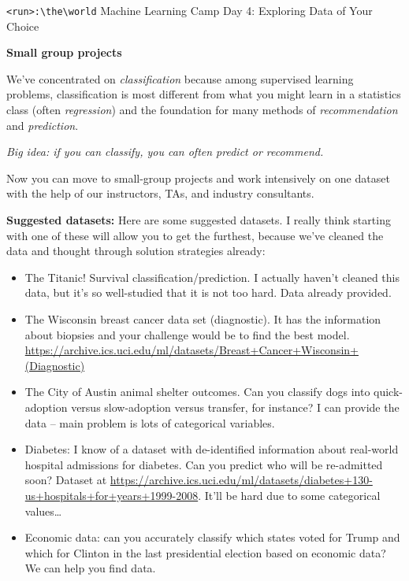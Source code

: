\documentclass[10pt]{article}
\newcommand{\code}[1]{\colorbox{light-gray}{\texttt{#1}}}
\newcommand{\headerclass}{\code{<run>:\textbackslash the\textbackslash world} Machine Learning Camp}
\newcommand{\headersection}{Day 4: Exploring Data of Your Choice}
\newcommand{\headertitle}{Small group projects}
\begin{document}
\headerclass\xspace {} \headersection\\
\begin{center}{ \large \textbf{\headertitle} }\end{center}

We've concentrated on \textit{classification} because among supervised learning problems, classification is most different from what you might learn in a statistics class (often \textit{regression}) and the foundation for many methods of \textit{recommendation} and \textit{prediction}.

	\begin{center}
\textit{Big idea: if you can classify, you can often predict or recommend.}
\end{center}

Now you can move to small-group projects and work intensively on one dataset with the help of our instructors, TAs, and industry consultants.

\bigskip

\textbf{Suggested datasets:} Here are some suggested datasets. I really think starting with one of these will allow you to get the furthest, because we've cleaned the data and thought through solution strategies already:
\begin{itemize}
\item The Titanic! Survival classification/prediction. I actually haven't cleaned this data, but it's so well-studied that it is not too hard. Data already provided.
\item The Wisconsin breast cancer data set (diagnostic). It has the information about biopsies and your challenge would be to find the best model. \url{https://archive.ics.uci.edu/ml/datasets/Breast+Cancer+Wisconsin+(Diagnostic)}
\item The City of Austin animal shelter outcomes. Can you classify dogs into quick-adoption versus slow-adoption versus transfer, for instance? I can provide the data -- main problem is lots of categorical variables.
\item Diabetes: I know of a dataset with de-identified information about real-world hospital admissions for diabetes. Can you predict who will be re-admitted soon? Dataset at \url{https://archive.ics.uci.edu/ml/datasets/diabetes+130-us+hospitals+for+years+1999-2008}. It'll be hard due to some categorical values\ldots
\item Economic data: can you accurately classify which states voted for Trump and which for Clinton in the last presidential election based on economic data? We can help you find data.
\end{itemize}
\end{document}
